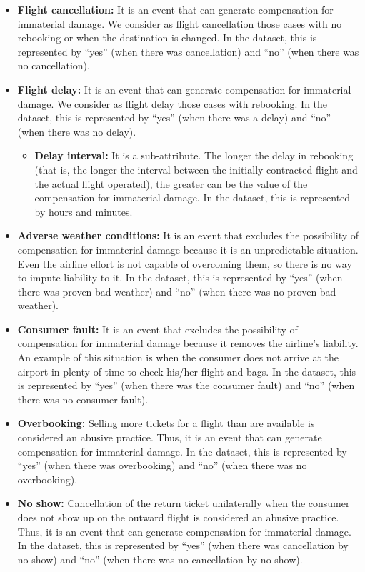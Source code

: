 \begin{itemize}[topsep=1em,leftmargin=1.5\parindent,align=left,labelwidth=0.5\parindent, noitemsep]
\begin{itemize}[noitemsep]
  \end{itemize}
  \item \textbf{Flight cancellation:} It is an event that can generate compensation for immaterial damage. We consider as flight cancellation those cases with no rebooking or when the destination is changed. In the dataset, this is represented by ``yes'' (when there was cancellation) and ``no'' (when there was no cancellation).
  \item \textbf{Flight delay:} It is an event that can generate compensation for immaterial damage. We consider as flight delay those cases with rebooking. In the dataset, this is represented by ``yes'' (when there was a delay) and ``no'' (when there was no delay).
  \begin{itemize}[noitemsep]
    \item   \textbf{Delay interval: }It is a sub-attribute. The longer the delay in rebooking (that is, the longer the interval between the initially contracted flight and the actual flight operated), the greater can be the value of the compensation for immaterial damage. In the dataset, this is represented by hours and minutes.
   \end{itemize}
   \item \textbf{Adverse weather conditions:} It is an event that excludes the possibility of compensation for immaterial damage because it is an unpredictable situation. Even the airline effort is not capable of overcoming them, so there is no way to impute liability to it. In the dataset, this is represented by ``yes'' (when there was proven bad weather) and ``no'' (when there was no proven bad weather). 
   \item \textbf{Consumer fault:} It is an event that excludes the possibility of compensation for immaterial damage because it removes the airline's liability. An example of this situation is when the consumer does not arrive at the airport in plenty of time to check his/her flight and bags. In the dataset, this is represented by ``yes'' (when there was the consumer fault) and ``no'' (when there was no consumer fault).
   \item\textbf{Overbooking:} Selling more tickets for a flight than are available is considered an abusive practice. Thus, it is an event that can generate compensation for immaterial damage. In the dataset, this is represented by ``yes'' (when there was overbooking) and ``no'' (when there was no overbooking). 
   \item\textbf{No show:} Cancellation of the return ticket unilaterally when the consumer does not show up on the outward flight is considered an abusive practice. Thus, it is an event that can generate compensation for immaterial damage. In the dataset, this is represented by ``yes'' (when there was cancellation by no show) and ``no'' (when there was no cancellation by no show).

\end{itemize}
